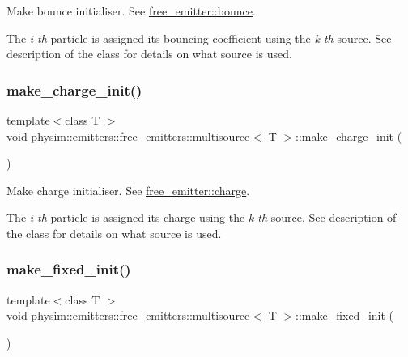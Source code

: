Make bounce initialiser. See \hyperlink{classphysim_1_1emitters_1_1free__emitter_a71006743e284b12904d7a4b4127ab4b8}{free\+\_\+emitter\+::bounce}. 

The {\itshape i-\/th} particle is assigned its bouncing coefficient using the {\itshape k-\/th} source. See description of the class for details on what source is used. \mbox{\label{classphysim_1_1emitters_1_1free__emitters_1_1multisource_adf1381635d55a57009d6e71a13c743d8}} 
\subsubsection{\texorpdfstring{make\+\_\+charge\+\_\+init()}{make\_charge\_init()}}
{\footnotesize\ttfamily template$<$class T $>$ \\
void \hyperlink{classphysim_1_1emitters_1_1free__emitters_1_1multisource}{physim\+::emitters\+::free\+\_\+emitters\+::multisource}$<$ T $>$\+::make\+\_\+charge\+\_\+init (\begin{DoxyParamCaption}{ }\end{DoxyParamCaption})}



Make charge initialiser. See \hyperlink{classphysim_1_1emitters_1_1free__emitter_a895244d2023c4cc72658d356bdb51b9a}{free\+\_\+emitter\+::charge}. 

The {\itshape i-\/th} particle is assigned its charge using the {\itshape k-\/th} source. See description of the class for details on what source is used. \mbox{\label{classphysim_1_1emitters_1_1free__emitters_1_1multisource_aa6fa54d4dc49b140005bf162e9b5f5b4}} 
\subsubsection{\texorpdfstring{make\+\_\+fixed\+\_\+init()}{make\_fixed\_init()}}
{\footnotesize\ttfamily template$<$class T $>$ \\
void \hyperlink{classphysim_1_1emitters_1_1free__emitters_1_1multisource}{physim\+::emitters\+::free\+\_\+emitters\+::multisource}$<$ T $>$\+::make\+\_\+fixed\+\_\+init (\begin{DoxyParamCaption}{ }\end{DoxyParamCaption})}



